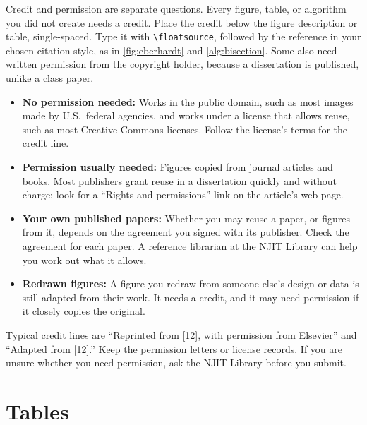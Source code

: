 Credit and permission are separate questions. Every figure, table, or algorithm you did not create needs a credit. Place the credit below the figure description or table, single-spaced. Type it with \verb+\floatsource+, followed by the reference in your chosen citation style, as in \cref{fig:eberhardt} and \cref{alg:bisection}. Some also need written permission from the copyright holder, because a dissertation is published, unlike a class paper.
\begin{itemize}
\item \textbf{No permission needed:} Works in the public domain, such as most images made by U.S.\ federal agencies, and works under a license that allows reuse, such as most Creative Commons licenses. Follow the license's terms for the credit line.
\item \textbf{Permission usually needed:} Figures copied from journal articles and books. Most publishers grant reuse in a dissertation quickly and without charge; look for a ``Rights and permissions'' link on the article's web page.
\item \textbf{Your own published papers:} Whether you may reuse a paper, or figures from it, depends on the agreement you signed with its publisher. Check the agreement for each paper. A reference librarian at the NJIT Library can help you work out what it allows.
\item \textbf{Redrawn figures:} A figure you redraw from someone else's design or data is still adapted from their work. It needs a credit, and it may need permission if it closely copies the original.
\end{itemize}
Typical credit lines are ``Reprinted from [12], with permission from Elsevier'' and ``Adapted from [12].'' Keep the permission letters or license records. If you are unsure whether you need permission, ask the NJIT Library before you submit.

\section{Tables}
\label{sec:tables}

